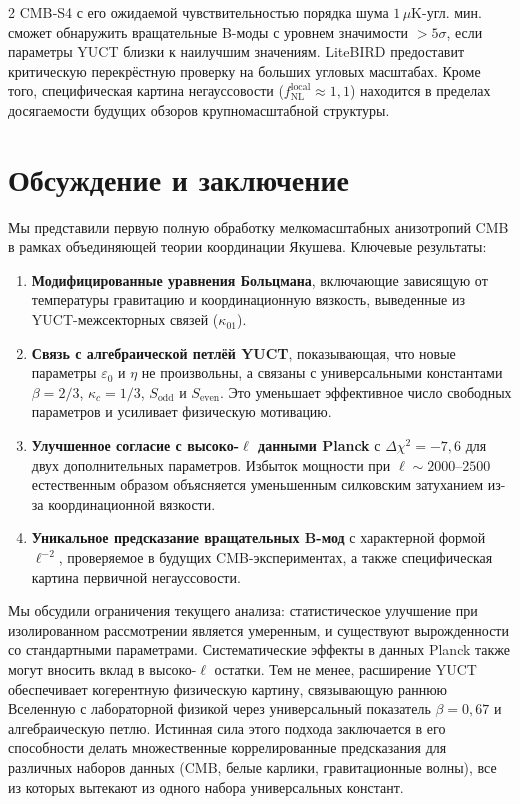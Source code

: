 \documentclass[11pt,a4paper]{article}
\begin{document}
\begin{multicols}{2}
		CMB‑S4 с его ожидаемой чувствительностью порядка шума $1\,\mu$K-угл. мин. сможет обнаружить вращательные B-моды с уровнем значимости $>5\sigma$, если параметры YUCT близки к наилучшим значениям. LiteBIRD предоставит критическую перекрёстную проверку на больших угловых масштабах. Кроме того, специфическая картина негауссовости ($f_{\mathrm{NL}}^{\mathrm{local}} \approx 1,1$) находится в пределах досягаемости будущих обзоров крупномасштабной структуры.
		
		\section{Обсуждение и заключение}
		
		Мы представили первую полную обработку мелкомасштабных анизотропий CMB в рамках объединяющей теории координации Якушева. Ключевые результаты:
		\begin{enumerate}
			\item \textbf{Модифицированные уравнения Больцмана}, включающие зависящую от температуры гравитацию и координационную вязкость, выведенные из YUCT-межсекторных связей ($\kappa_{01}$).
			\item \textbf{Связь с алгебраической петлёй YUCT}, показывающая, что новые параметры $\varepsilon_0$ и $\eta$ не произвольны, а связаны с универсальными константами $\beta=2/3$, $\kappa_c=1/3$, $S_{\mathrm{odd}}$ и $S_{\mathrm{even}}$. Это уменьшает эффективное число свободных параметров и усиливает физическую мотивацию.
			\item \textbf{Улучшенное согласие с высоко-$\ell$ данными Planck} с $\Delta\chi^2 = -7,6$ для двух дополнительных параметров. Избыток мощности при $\ell \sim 2000$--$2500$ естественным образом объясняется уменьшенным силковским затуханием из-за координационной вязкости.
			\item \textbf{Уникальное предсказание вращательных B-мод} с характерной формой $\ell^{-2}$, проверяемое в будущих CMB-экспериментах, а также специфическая картина первичной негауссовости.
		\end{enumerate}
		
		Мы обсудили ограничения текущего анализа: статистическое улучшение при изолированном рассмотрении является умеренным, и существуют вырожденности со стандартными параметрами. Систематические эффекты в данных Planck также могут вносить вклад в высоко-$\ell$ остатки. Тем не менее, расширение YUCT обеспечивает когерентную физическую картину, связывающую раннюю Вселенную с лабораторной физикой через универсальный показатель $\beta = 0,67$ и алгебраическую петлю. Истинная сила этого подхода заключается в его способности делать множественные коррелированные предсказания для различных наборов данных (CMB, белые карлики, гравитационные волны), все из которых вытекают из одного набора универсальных констант.
		

\end{multicols}
\end{document}
